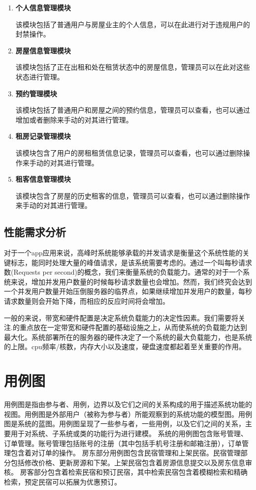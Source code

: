 \documentclass[lang=cn,11pt,a4paper,cite=authoryear]{elegantpaper}
\begin{document}
\begin{enumerate}
    \def\labelenumi{\arabic{enumi}.}
    \item
          \textbf{个人信息管理模块}

          该模块包括了普通用户与房屋业主的个人信息，可以在此进行对于违规用户的封禁操作。
    \item
          \textbf{房屋信息管理模块}

          该模块包括了正在出租和处在租赁状态中的房屋信息，管理员可以在此对这些状态进行管理。
    \item
          \textbf{预约管理模块}

          该模块包括了普通用户和房屋之间的预约信息，管理员可以查看，也可以通过增加或者删除来手动的对其进行管理。
    \item
          \textbf{租房记录管理模块}

          该模块包含了用户的房租租赁信息记录，管理员可以查看，也可以通过删除操作来手动的对其进行管理。
    \item
          \textbf{租客信息管理模块}

          该模块包含了房屋的历史租客的信息，管理员可以查看，也可以通过删除操作来手动的对其进行管理。
\end{enumerate}

\subsection{性能需求分析}

对于一个app应用来说，高峰时系统能够承载的并发请求是衡量这个系统性能的关键标志，能同时处理大量的峰值请求，是该系统需要考虑的。通过一个叫每秒请求数(Requests
per
second)的概念，我们来衡量系统的负载能力。通常的对于一个系统来说，增加并发用户数量的时候每秒请求数量也会增加。然而，我们终究会达到一个并发用户数量开始压倒服务器的临界点，如果继续增加并发用户的数量，每秒请求数量则会开始下降，而相应的反应时间将会增加。

一般的来说，带宽和硬件配置是决定系统负载能力的决定性因素。我们需要将关注.的重点放在一定带宽和硬件配置的基础设施之上，从而使系统的负载能力达到最大化。系统部署所在的服务器的硬件决定了一个系统的最大负载能力，也是系统的上限。cpu频率/核数，内存大小以及速度，硬盘速度都起着至关重要的作用。

\section{用例图}

用例图是指由参与者、用例，边界以及它们之间的关系构成的用于描述系统功能的视图。用例图是外部用户（被称为参与者）所能观察到的系统功能的模型图。用例图是系统的蓝图。用例图呈现了一些参与者，一些用例，以及它们之间的关系，主要用于对系统、子系统或类的功能行为进行建模。
系统的用例图包含账号管理、订单管理。账号管理包括账号的注册（其中包括手机号注册和邮箱注册），订单管理包含着对订单的操作。
房东部分用例图包含民宿管理和上架民宿。民宿管理部分包括修改价格、更新房源和下架。上架民宿包含着房源信息提交以及房东信息审核。
房客部分包含着检索民宿和预订民宿，其中检索民宿包含着模糊检索和精确检索，预定民宿可以拓展为优惠预订。
\end{document}
